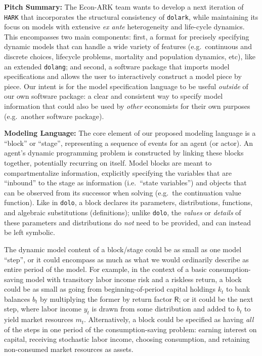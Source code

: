 \documentclass[12pt,pdftex,letterpaper]{article}
\begin{document}
\noindent \textbf{Pitch Summary:} The Econ-ARK team wants to develop a next iteration of \texttt{HARK} that incorporates the structural consistency of \texttt{dolark}, while maintaining its focus on models with extensive \textit{ex ante} heterogeneity and life-cycle dynamics. This encompasses two main components: first, a format for precisely specifying dynamic models that can handle a wide variety of features (e.g.\ continuous and discrete choices, lifecycle problems, mortality and population dynamics, etc), like an extended \texttt{dolang}; and second, a software package that imports model specifications and allows the user to interactively construct a model piece by piece. Our intent is for the model specification language to be useful \textit{outside} of our own software package: a clear and consistent way to specify model information that could also be used by \textit{other} economists for their own purposes (e.g.\ another software package).

\vspace{0.35cm}

\noindent \textbf{Modeling Language:} The core element of our proposed modeling language is a ``block'' or ``stage'', representing a sequence of events for an agent (or actor). An agent's dynamic programming problem is constructed by linking these blocks together, potentially recurring on itself. Model blocks are meant to compartmentalize information, explicitly specifying the variables that are ``inbound'' to the stage as information (i.e.\ ``state variables'') and objects that can be observed from its successor when solving (e.g.\ the continuation value function). Like in \texttt{dolo}, a block declares its parameters, distributions, functions, and algebraic substitutions (definitions); unlike \texttt{dolo}, the \textit{values} or \textit{details} of these parameters and distributions do \textit{not} need to be provided, and can instead be left symbolic.

The dynamic model content of a block/stage could be as small as one model ``step'', or it could encompass as much as what we would ordinarily describe as entire period of the model. For example, in the context of a basic consumption-saving model with transitory labor income risk and a riskless return, a block could be as small as going from beginning-of-period capital holdings $k_t$ to bank balances $b_t$ by multiplying the former by return factor $\mathsf{R}$; or it could be the next step, where labor income $y_t$ is drawn from some distribution and added to $b_t$ to yield market resources $m_t$. Alternatively, a block could be specified as having \textit{all} of the steps in one period of the consumption-saving problem: earning interest on capital, receiving stochastic labor income, choosing consumption, and retaining non-consumed market resources as assets.
\end{document}
